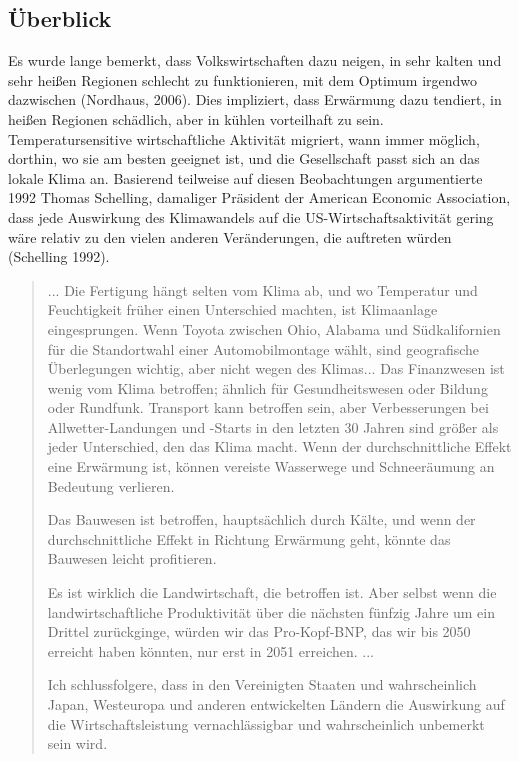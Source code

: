 \documentclass[12pt,paper=a4,DIV=12,parskip=never,chapterprefix=false,headings=standardclasses]{scrreprt}
\begin{document}
\subsection{Überblick}
Es wurde lange bemerkt, dass Volkswirtschaften dazu neigen, in sehr kalten und sehr heißen Regionen schlecht zu funktionieren, mit dem Optimum irgendwo dazwischen (Nordhaus, 2006). Dies impliziert, dass Erwärmung dazu tendiert, in heißen Regionen schädlich, aber in kühlen vorteilhaft zu sein. Temperatursensitive wirtschaftliche Aktivität migriert, wann immer möglich, dorthin, wo sie am besten geeignet ist, und die Gesellschaft passt sich an das lokale Klima an. Basierend teilweise auf diesen Beobachtungen argumentierte 1992 Thomas Schelling, damaliger Präsident der American Economic Association, dass jede Auswirkung des Klimawandels auf die US-Wirtschaftsaktivität gering wäre relativ zu den vielen anderen Veränderungen, die auftreten würden (Schelling 1992).

\begin{quote}
... Die Fertigung hängt selten vom Klima ab, und wo Temperatur und Feuchtigkeit früher einen Unterschied machten, ist Klimaanlage eingesprungen. Wenn Toyota zwischen Ohio, Alabama und Südkalifornien für die Standortwahl einer Automobilmontage wählt, sind geografische Überlegungen wichtig, aber nicht wegen des Klimas... Das Finanzwesen ist wenig vom Klima betroffen; ähnlich für Gesundheitswesen oder Bildung oder Rundfunk. Transport kann betroffen sein, aber Verbesserungen bei Allwetter-Landungen und -Starts in den letzten 30 Jahren sind größer als jeder Unterschied, den das Klima macht. Wenn der durchschnittliche Effekt eine Erwärmung ist, können vereiste Wasserwege und Schneeräumung an Bedeutung verlieren.

Das Bauwesen ist betroffen, hauptsächlich durch Kälte, und wenn der durchschnittliche Effekt in Richtung Erwärmung geht, könnte das Bauwesen leicht profitieren.

Es ist wirklich die Landwirtschaft, die betroffen ist. Aber selbst wenn die landwirtschaftliche Produktivität über die nächsten fünfzig Jahre um ein Drittel zurückginge, würden wir das Pro-Kopf-BNP, das wir bis 2050 erreicht haben könnten, nur erst in 2051 erreichen. ...

Ich schlussfolgere, dass in den Vereinigten Staaten und wahrscheinlich Japan, Westeuropa und anderen entwickelten Ländern die Auswirkung auf die Wirtschaftsleistung vernachlässigbar und wahrscheinlich unbemerkt sein wird.
\end{quote}
\end{document}
